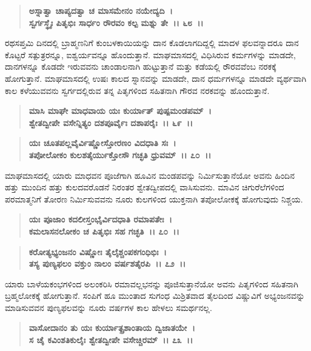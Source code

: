 \begin{verse}
\textbf{ಅಸ್ನಾತ್ವಾ ಚಾಪ್ಯದತ್ವಾ ಚ ಮಾಸಮೇನಂ ನಯೇದ್ಯದಿ~।}\\\textbf{ಸ್ವರ್ಗಸ್ಥೈಃ ಪಿತೃಭಿಃ ಸಾರ್ಧಂ ರೌರವಂ ಕಲ್ಪ ಮಶ್ನು ತೇ~।। ೬೮~।।}
\end{verse}

ರಥಸಪ್ತಮಿ ದಿನದಲ್ಲಿ ಬ್ರಾಹ್ಮಣನಿಗೆ ಕುಂಬಳಕಾಯಿಯನ್ನು ದಾನ ಕೊಡಲಾಗದಿದ್ದಲ್ಲಿ ಮಾದಳ ಫಲವನ್ನಾದರೂ ದಾನ ಕೊಟ್ಟರೆ ಸತ್ಪುತ್ರರನ್ನೂ, ಐಶ್ವರ್ಯವನ್ನೂ ಹೊಂದುತ್ತಾನೆ. ಮಾಘಮಾಸದಲ್ಲಿ ವಿಧಿಸಿರುವ ಕರ್ಮಗಳನ್ನು ಮಾಡದೇ, ದಾನಗಳನ್ನೂ ಕೊಡದೇ ಇರುವವನು ಚಾಂಡಾಲನಾಗಿ ಹುಟ್ಟುತ್ತಾನೆ ಮತ್ತು ಕಡೆಯಲ್ಲಿ ರೌರವವೆಂಬ ನರಕಕ್ಕೆ ಹೋಗುತ್ತಾನೆ. ಮಾಘಮಾಸದಲ್ಲಿ ಉಷಃ ಕಾಲದ ಸ್ನಾನವನ್ನು ಮಾಡದೇ, ದಾನ ಧರ್ಮಗಳನ್ನೂ ಮಾಡದೇ ವ್ಯರ್ಥವಾಗಿ ಕಾಲ ಕಳೆಯುವವನು ಸ್ವರ್ಗದಲ್ಲಿರುವ ತನ್ನ ಪಿತೃಗಳಿಂದ ಸಹಿತನಾಗಿ ಗೌರವ ನರಕವನ್ನು ಹೊಂದುತ್ತಾನೆ.

\begin{verse}
\textbf{ಮಾಸಿ ಮಾಘೇ ಮಾಧವಾಯ ಯಃ ಕುರ್ಯಾತ್ ಪುಷ್ಪಮಂಡಪಮ್~।}\\\textbf{ಶ್ವೇತದ್ವೀಪೇ ವಸೇನ್ನಿತ್ಯಂ ದಶಪೂರ್ವೈಃ ದಶಾಪರೈಃ~।। ೬೯~।।}
\end{verse}

\begin{verse}
\textbf{ಯಃ ಚೂತಪಲ್ಲವೈರ್ವಿಷ್ಣೋಸ್ತೋರಣಂ ವಿದಧಾತಿ ಸಃ~।}\\\textbf{ತಪೋಲೋಕಂ ಕುಲಶತೈರ್ಯುಕ್ತೋಸೌ ಗಚ್ಛತಿ ಧ್ರುವಮ್~।। ೭೦~।।}
\end{verse}

ಮಾಘಮಾಸದಲ್ಲಿ ಯಾರು ಮಾಧವನ ಪೂಜೆಗಾಗಿ ಹೂವಿನ ಮಂಡಪವನ್ನು ನಿರ್ಮಿಸುತ್ತಾನೆಯೋ ಅವನು ಹಿಂದಿನ ಹತ್ತು ಮುಂದಿನ ಹತ್ತು ಕುಲದವರೊಡನೆ ನಿರಂತರ ಶ್ವೇತದ್ವೀಪದಲ್ಲಿ ವಾಸಿಸುವನು. ಮಾವಿನ ಚಿಗುರೆಲೆಗಳಿಂದ ಪರಮಾತ್ಮನಿಗೆ ತೋರಣ ನಿರ್ಮಿಸುವವನು ನೂರು ಕುಲಗಳಿಂದ ಯುಕ್ತನಾಗಿ ತಪೋಲೋಕಕ್ಕೆ ಹೋಗುವುದು ನಿಶ್ಚಯ.

\begin{verse}
\textbf{ಯಃ ಪೂಜಾಂ ಕದಲೀಸ್ತಂಭೈರ್ವಿದಧಾತಿ ರಮಾಪತೇಃ~।}\\\textbf{ಕಮಲಾಸನಲೋಕಂ ಚ ಪಿತೃಭಿಃ ಸಹ ಗಚ್ಛತಿ~।। ೭೦~।। }
\end{verse}

\begin{verse}
\textbf{ಕರೋತ್ಯಭ್ಯಂಜನಂ ವಿಷ್ಣೋಃ ತೈಲೈಶ್ಚಂಪಕಗಂಧಿಭಿಃ~।}\\\textbf{ತಸ್ಯ ಪುಣ್ಯಫಲಂ ವಕ್ತುಂ ನಾಲಂ ವರ್ಷಶತೈರಪಿ~।। ೭೨~।।}
\end{verse}

ಯಾರು ಬಾಳೆಯಕಂಭಗಳಿಂದ ಅಲಂಕರಿಸಿ ರಮಾವಲ್ಲಭನನ್ನು ಪೂಜಿಸುತ್ತಾನೆಯೋ ಅವನು ಪಿತೃಗಳಿಂದ ಸಹಿತನಾಗಿ ಬ್ರಹ್ಮಲೋಕಕ್ಕೆ ಹೋಗುತ್ತಾನೆ. ಸಂಪಿಗೆ ಹೂ ಮುಂತಾದ ಸುಗಂಧ ಮಿಶ್ರಿತವಾದ ತೈಲದಿಂದ ವಿಷ್ಣುವಿಗೆ ಅಭ್ಯಂಜನವನ್ನು ಮಾಡಿಸುವವನ ಪುಣ್ಯಫಲವನ್ನು ನೂರು ವರ್ಷಗಳ ಕಾಲ ಹೇಳಲು ಸಮರ್ಥನಲ್ಲ.

\begin{verse}
\textbf{ವಾಸೋದಾನಂ ತು ಯಃ ಕುರ್ಯಾತ್ಪ್ರಶಾಂತಾಯ ದ್ವಿಜಾತಯೇ~।}\\\textbf{ಸ ಚೈ ಕವಿಂಶತಿಕುಲೈಃ ಶ್ವೇತದ್ವೀಪೇ ವಸೇಚ್ಚಿರಮ್~।। ೭೩~।। }
\end{verse}

